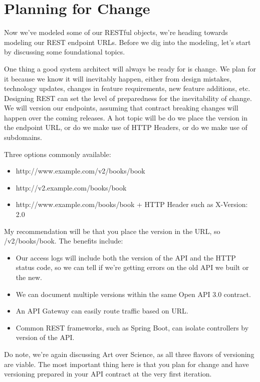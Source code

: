 \section{Planning for Change}

Now we've modeled some of our RESTful objects, we're heading towards modeling our REST endpoint URLs.  Before we dig into the modeling, let's start by discussing some foundational topics.

One thing a good system architect will always be ready for is change.  We plan for it because we know it will inevitably happen, either from design mistakes, technology updates, changes in feature requirements, new feature additions, etc.  Designing REST can set the level of preparedness for the inevitability of change.  We will version our endpoints, assuming that contract breaking changes will happen over the coming releases.  A hot topic will be do we place the version in the endpoint URL, or do we make use of HTTP Headers, or do we make use of subdomains.

Three options commonly available:

\begin{itemize}
  \item http://www.example.com/v2/books/book
  \item http://v2.example.com/books/book
  \item http://www.example.com/books/book + HTTP Header such as X-Version: 2.0
\end{itemize}

My recommendation will be that you place the version in the URL, so /v2/books/book.  The benefits include:
\begin{itemize}
  \item Our access logs will include both the version of the API and the HTTP status code, so we can tell if we're getting errors on the old API we built or the new.
  \item We can document multiple versions within the same Open API 3.0 contract.
  \item An API Gateway can easily route traffic based on URL.
  \item Common REST frameworks, such as Spring Boot, can isolate controllers by version of the API.
\end{itemize}

Do note, we're again discussing Art over Science, as all three flavors of versioning are viable.  The most important thing here is that you plan for change and have versioning prepared in your API contract at the very first iteration.

